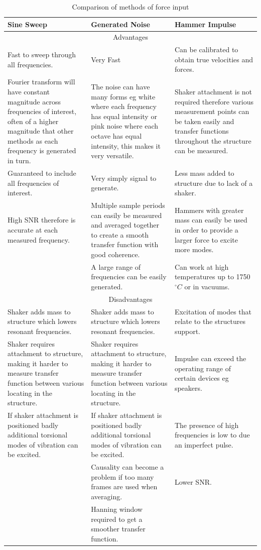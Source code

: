 \documentclass[twoside,onecolumn]{article}
\begin{document}
\begin{table}[!htb]
\caption{Comparison of methods of force input}
\centering
\begin{tabular}{ p{46mm} | p{46mm} | p{46mm} }
Sine Sweep & Generated Noise & Hammer Impulse \\
\midrule
\multicolumn{3}{c}{Advantages}\\
Fast to sweep through all frequencies. & Very Fast & Can be calibrated to obtain true velocities and forces.  \\
Fourier transform will have constant magnitude across frequencies of interest, often of a higher magnitude that other methods as each frequency is generated in turn.&The noise can have many forms eg white where each frequency has equal intensity or pink noise where each octave has equal intensity, this makes it very versatile. & Shaker attachment is not required therefore various measurement points can be taken easily and transfer functions throughout the structure can be measured.\\
Guaranteed to include all frequencies of interest. &  Very simply signal to generate. & Less mass added to structure due to lack of a shaker. \\
High SNR therefore is accurate at each measured frequency.& Multiple sample periods can easily be measured and averaged together to create a smooth transfer function with good coherence.& Hammers with greater mass can easily be used in order to provide a larger force to excite more modes. \\
 &A large range of frequencies can be easily generated.& Can work at high temperatures up to 1750$^{\circ}C$ or in vacuums.\\
\midrule
\multicolumn{3}{c}{Disadvantages}\\
Shaker adds mass to structure which lowers resonant frequencies.&Shaker adds mass to structure which lowers resonant frequencies.& Excitation of modes that relate to the structures support.\\
Shaker requires attachment to structure, making it harder to measure transfer function between various locating in the structure.&Shaker requires attachment to structure, making it harder to measure transfer function between various locating in the structure.&Impulse can exceed the operating range of certain devices eg speakers.\\
If shaker attachment is positioned badly additional torsional modes of vibration can be excited.&If shaker attachment is positioned badly additional torsional modes of vibration can be excited.&The presence of high frequencies is low to due an imperfect pulse.\\
&Causality can become a problem if too many frames are used when averaging.&Lower SNR.\\
&Hanning window required to get a smoother transfer function.& \\
\end{tabular}
\label{table:comp}
\end{table}
\end{document}
